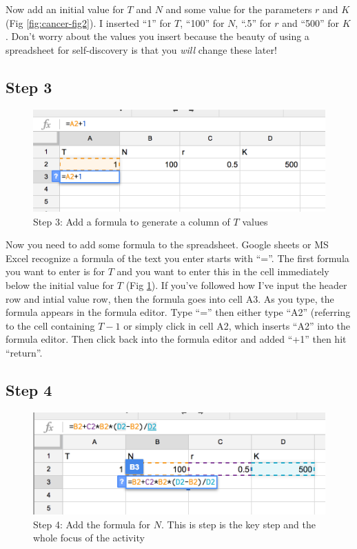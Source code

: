 \documentclass[]{book}
\begin{document}
Now add an initial value for \(T\) and \(N\) and some value for the
parameters \(r\) and \(K\) (Fig \ref{fig:cancer-fig2}). I inserted ``1''
for \(T\), ``100'' for \(N\), ``.5'' for \(r\) and ``500'' for \(K\).
Don't worry about the values you insert because the beauty of using a
spreadsheet for self-discovery is that you \emph{will} change these
later!

\subsection{Step 3}\label{step-3}

\begin{figure}

{\centering \includegraphics[width=0.8\linewidth]{images/logistic3} 

}

\caption{Step 3: Add a formula to generate a column of $T$ values}\label{fig:cancer-fig3}
\end{figure}

Now you need to add some formula to the spreadsheet. Google sheets or MS
Excel recognize a formula of the text you enter starts with ``=''. The
first formula you want to enter is for \(T\) and you want to enter this
in the cell immediately below the initial value for \(T\) (Fig
\ref{fig:cancer-fig3}). If you've followed how I've input the header row
and intial value row, then the formula goes into cell A3. As you type,
the formula appears in the formula editor. Type ``='' then either type
``A2'' (referring to the cell containing \(T-1\) or simply click in cell
A2, which inserts ``A2'' into the formula editor. Then click back into
the formula editor and added ``+1'' then hit ``return''.

\subsection{Step 4}\label{step-4}

\begin{figure}

{\centering \includegraphics[width=0.8\linewidth]{images/logistic4} 

}

\caption{Step 4: Add the formula for $N$. This is step is the key step and the whole focus of the activity}\label{fig:cancer-fig4}
\end{figure}
\end{document}
